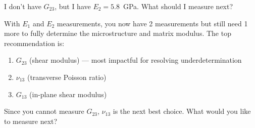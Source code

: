 \documentclass[preprint,review,10pt,number]{elsarticle}
\begin{document}
\begin{center}
\begin{tcolorbox}
\vspace{8pt}
\begin{tcolorbox}[
    breakable,
    colback=gray!8, colframe=gray!60, boxrule=0.5pt, arc=2pt,
    left=6pt, right=6pt, top=4pt, bottom=4pt,
    title={\textbf{User}}, fonttitle=\small\bfseries, coltitle=black
]
\small
I don't have $G_{23}$, but I have $E_2=5.8$~GPa. What should I measure next?
\end{tcolorbox}
\vspace{4pt}
\begin{tcolorbox}[
    breakable,
    colback=gray!3, colframe=gray!40, boxrule=0.5pt, arc=2pt,
    left=6pt, right=6pt, top=4pt, bottom=4pt,
    title={\textbf{\texttt{MateriAl}} \hfill \texttt{\footnotesize\textcolor{gray!70!black}{\ding{110}\ check\_identifiability}}},
    fonttitle=\small\bfseries, coltitle=black
]
\small
With $E_1$ and $E_2$ measurements, you now have 2 measurements but still need 1 more to fully determine the microstructure and matrix modulus. The top recommendation is:
\begin{enumerate}[leftmargin=1.4em, itemsep=1pt, topsep=2pt]
\item $G_{23}$ (shear modulus) --- most impactful for resolving underdetermination
\item $\nu_{13}$ (transverse Poisson ratio)
\item $G_{13}$ (in-plane shear modulus)
\end{enumerate}
Since you cannot measure $G_{23}$, $\nu_{13}$ is the next best choice. What would you like to measure next?
\end{tcolorbox}


\end{tcolorbox}
\end{center}
\end{document}

